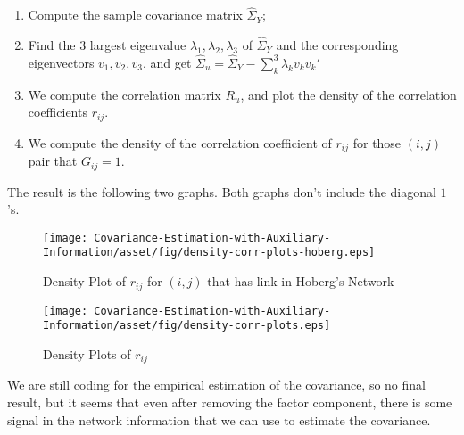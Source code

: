         \begin{enumerate}
            \item Compute the sample covariance matrix \(\hat{\Sigma}_{Y}\);
            \item Find the 3 largest eigenvalue \(\lambda_{1},\lambda_{2}, \lambda_{3}\) of \(\hat{\Sigma}_{Y}\) and the corresponding eigenvectors \(v_{1}, v_{2}, v_{3}\), and get \(\hat{\Sigma}_{u} = \hat{\Sigma}_{Y} - \sum_{k}^{3} \lambda_{k} v_{k} v_{k}' \)
            \item We compute the correlation matrix \(R_{u}\), and plot the density of the correlation coefficients \(r_{ij}\). 
            \item We compute the density of the correlation coefficient of \(r_{ij}\) for those \((i,j)\) pair that \(G_{ij} = 1\). 
        \end{enumerate}
        The result is the following two graphs. Both graphs don't include the diagonal \(1\)'s. 
        \begin{figure}[htbp]
            \centering
            \texttt{[image: Covariance-Estimation-with-Auxiliary-Information/asset/fig/density-corr-plots-hoberg.eps]}
            \caption{Density Plot of \(r_{ij}\) for \((i,j)\) that has link in Hoberg's Network}
            \label{<label>}
        \end{figure}

        \begin{figure}[htbp]
            \centering
            \texttt{[image: Covariance-Estimation-with-Auxiliary-Information/asset/fig/density-corr-plots.eps]}           
            \caption{Density Plots of \(r_{ij}\)}
        \end{figure}       

        We are still coding for the empirical estimation of the covariance, so no final result, but it seems that even after removing the factor component, there is some signal in the network information that we can use to estimate the covariance.